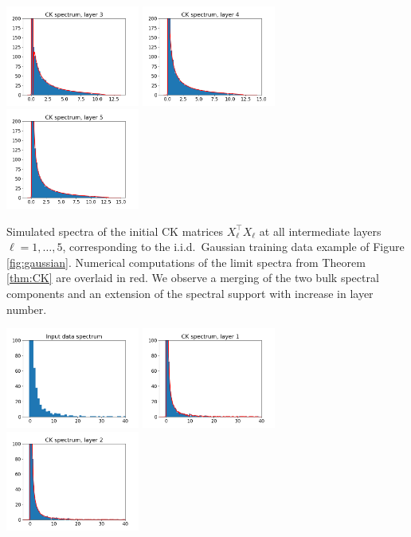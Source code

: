 \documentclass{article}
\theoremstyle{definition}
\newcommand{\1}{\mathbf{1}}
\begin{document}
\includegraphics[width=0.33\textwidth]{figures/gaussian1_X3.png}%
\includegraphics[width=0.33\textwidth]{figures/gaussian1_X4.png}%
\includegraphics[width=0.33\textwidth]{figures/gaussian1_X5.png}

Simulated spectra of the initial CK matrices $X_\ell^\top
X_\ell$ at all intermediate
layers $\ell=1,\ldots,5$, corresponding to the i.i.d.\ Gaussian
training data example of Figure \ref{fig:gaussian}. Numerical computations
of the limit spectra from Theorem \ref{thm:CK} are overlaid in red. We observe a
merging of the two bulk spectral components and an extension of the spectral
support with increase in layer number.

\includegraphics[width=0.33\textwidth]{figures/CIFAR_raw_X0.png}%
\includegraphics[width=0.33\textwidth]{figures/CIFAR_raw_X1.png}%
\includegraphics[width=0.33\textwidth]{figures/CIFAR_raw_X2.png}
\end{document}
